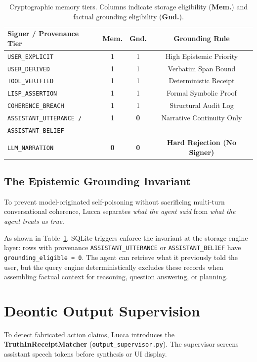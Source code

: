 \documentclass[10pt,twocolumn]{article}
\begin{document}
\begin{table}[t]
\centering
\small
\begin{tabular}{lccc}
\toprule
\textbf{Signer / Provenance Tier} & \textbf{Mem.} & \textbf{Gnd.} & \textbf{Grounding Rule} \\
\midrule
\texttt{USER\_EXPLICIT} & 1 & 1 & High Epistemic Priority \\
\texttt{USER\_DERIVED} & 1 & 1 & Verbatim Span Bound \\
\texttt{TOOL\_VERIFIED} & 1 & 1 & Deterministic Receipt \\
\texttt{LISP\_ASSERTION} & 1 & 1 & Formal Symbolic Proof \\
\texttt{COHERENCE\_BREACH} & 1 & 1 & Structural Audit Log \\
\texttt{ASSISTANT\_UTTERANCE /} & 1 & \textbf{0} & Narrative Continuity Only \\
\quad \texttt{ASSISTANT\_BELIEF} & & & \\
\texttt{LLM\_NARRATION} & \textbf{0} & \textbf{0} & \textbf{Hard Rejection (No Signer)} \\
\bottomrule
\end{tabular}
\caption{Cryptographic memory tiers. Columns indicate storage eligibility (\textbf{Mem.}) and factual grounding eligibility (\textbf{Gnd.}).}
\label{tab:tiers}
\end{table}

\subsection{The Epistemic Grounding Invariant}
To prevent model-originated self-poisoning without sacrificing multi-turn conversational coherence, Lucca separates \textit{what the agent said} from \textit{what the agent treats as true}. 

As shown in Table~\ref{tab:tiers}, SQLite triggers enforce the invariant at the storage engine layer: rows with provenance \texttt{ASSISTANT\_UTTERANCE} or \texttt{ASSISTANT\_BELIEF} have \texttt{grounding\_eligible = 0}. The agent can retrieve what it previously told the user, but the query engine deterministically excludes these records when assembling factual context for reasoning, question answering, or planning.

\section{Deontic Output Supervision}
To detect fabricated action claims, Lucca introduces the \textbf{TruthInReceiptMatcher} (\texttt{output\_supervisor.py}). The supervisor screens assistant speech tokens before synthesis or UI display.
\end{document}

